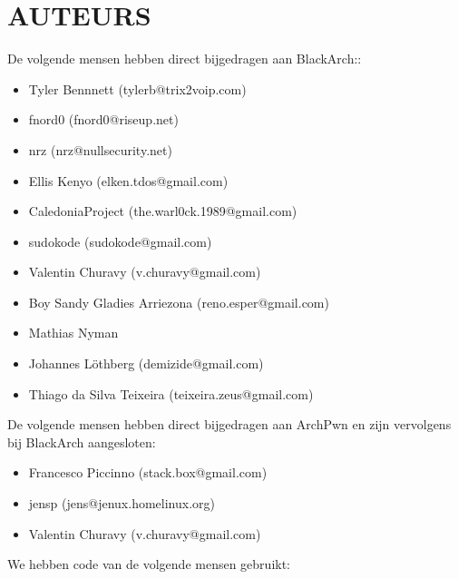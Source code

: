 \section{AUTEURS}
De volgende mensen hebben direct bijgedragen aan BlackArch::
\begin{itemize}
\item Tyler Bennnett (tylerb@trix2voip.com)
\item fnord0 (fnord0@riseup.net)
\item nrz (nrz@nullsecurity.net)
\item Ellis Kenyo (elken.tdos@gmail.com)
\item CaledoniaProject (the.warl0ck.1989@gmail.com)
\item sudokode (sudokode@gmail.com)
\item Valentin Churavy (v.churavy@gmail.com)
\item Boy Sandy Gladies Arriezona (reno.esper@gmail.com)
\item Mathias Nyman
\item Johannes Löthberg (demizide@gmail.com)
\item Thiago da Silva Teixeira (teixeira.zeus@gmail.com)
\end{itemize}
De volgende mensen hebben direct bijgedragen aan ArchPwn en
zijn vervolgens bij BlackArch aangesloten:
\begin{itemize}
\item Francesco Piccinno (stack.box@gmail.com)
\item jensp (jens@jenux.homelinux.org)
\item Valentin Churavy (v.churavy@gmail.com)
\end{itemize}
We hebben code van de volgende mensen gebruikt:
